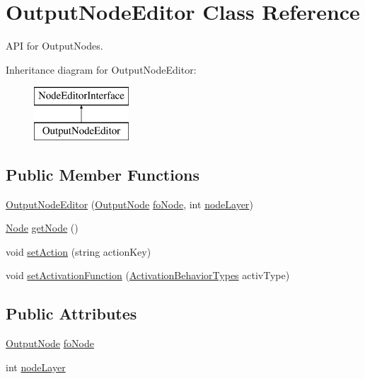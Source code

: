 \hypertarget{class_output_node_editor}{}\section{Output\+Node\+Editor Class Reference}
\label{class_output_node_editor}


A\+PI for Output\+Nodes.  


Inheritance diagram for Output\+Node\+Editor\+:\begin{figure}[H]
\begin{center}
\leavevmode
\includegraphics[height=2.000000cm]{class_output_node_editor}
\end{center}
\end{figure}
\subsection*{Public Member Functions}
\begin{DoxyCompactItemize}
\item 
\mbox{\hyperlink{class_output_node_editor_a623838b68ab06f8409a371e119bf70ac}{Output\+Node\+Editor}} (\mbox{\hyperlink{class_output_node}{Output\+Node}} \mbox{\hyperlink{class_output_node_editor_a78bb1baa0dddf7eb38ac12357ddea2f6}{fo\+Node}}, int \mbox{\hyperlink{class_output_node_editor_acbb36568e920b010b900395a59959e9d}{node\+Layer}})
\item 
\mbox{\hyperlink{class_node}{Node}} \mbox{\hyperlink{class_output_node_editor_afca854ca2a34703a1becfee48da12631}{get\+Node}} ()
\item 
void \mbox{\hyperlink{class_output_node_editor_a04ec0f0500518d70391de298bcb07513}{set\+Action}} (string action\+Key)
\item 
void \mbox{\hyperlink{class_output_node_editor_a832616727e8d1ab1a1a5e8c8d793ac0d}{set\+Activation\+Function}} (\mbox{\hyperlink{_non_input_node_8cs_a832a6943e91e304dea9608c4ae2818e7}{Activation\+Behavior\+Types}} activ\+Type)
\end{DoxyCompactItemize}
\subsection*{Public Attributes}
\begin{DoxyCompactItemize}
\item 
\mbox{\hyperlink{class_output_node}{Output\+Node}} \mbox{\hyperlink{class_output_node_editor_a78bb1baa0dddf7eb38ac12357ddea2f6}{fo\+Node}}
\item 
int \mbox{\hyperlink{class_output_node_editor_acbb36568e920b010b900395a59959e9d}{node\+Layer}}
\end{DoxyCompactItemize}


